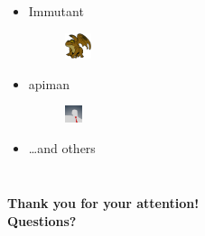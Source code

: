 \documentclass[10pt,utf8]{beamer}
\begin{document}
\begin{frame}
\begin{columns}
\begin{itemize}
\begin{figure}
				\end{figure}
			\item Immutant
				\hspace{10cm}
				\begin{figure}
					\vspace{-1cm}
					\includegraphics[height=0.75cm]{./img/immutant.eps}
				\end{figure}
			\item apiman
				\hspace{10cm}
				\begin{figure}
					\vspace{-1cm}
					\includegraphics[height=0.5cm]{./img/apiman.eps}
				\end{figure}
			\item \dots and others
		\end{itemize}
	\end{columns}
\end{frame}


\begin{frame}
	\centering
	\huge{\textbf{Thank you for your attention!}} \\
	\vspace{1cm}
	\huge{\textbf{Questions?}}
\end{frame}

\end{document}
